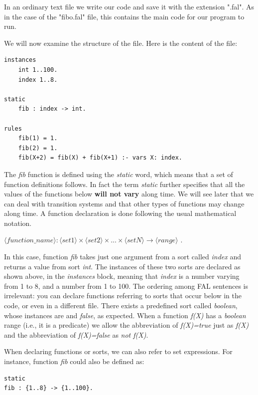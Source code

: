 \documentclass[a4paper,12pt]{report}
\begin{document}
	In an ordinary text file we write our code and save it with the extension ".fal". As in the case of the "fibo.fal" file, this contains the main code for our program to run. 

	We will now examine the structure of the file. Here is the content of the file:
\begin{verbatim}  
instances
	int 1..100.
	index 1..8.

static
	fib : index -> int.

rules
	fib(1) = 1.
	fib(2) = 1.
	fib(X+2) = fib(X) + fib(X+1) :- vars X: index.

\end{verbatim}

	The \textit{fib} function is defined using the \textit{static} word, which means that a set of function definitions follows. In fact the term \textit{static} further specifies that all the values of the functions below \textbf{will not vary} along time. We will see later that we can deal with transition systems and that other types of functions may change along time. A function declaration is done following the usual mathematical notation.


\begin{addmargin}
$\langle function\_name\rangle : \langle set1\rangle \times \langle set2\rangle \times ... \times \langle setN\rangle   \rightarrow   \langle range\rangle$ .
\end{addmargin}


	In this case, function \textit{fib} takes just one argument from a sort called \textit{index} and returns a value from sort \textit{int}. The instances of these two sorts are declared as shown above, in the \textit{instances} block, meaning that \textit{index} is a number varying from 1 to 8, and  a number from 1 to 100.
The ordering among FAL sentences is irrelevant: you can declare functions referring to sorts that occur below in the code, or even in a different file. There exists a predefined sort called \textit{boolean}, whose instances are  and \textit{false}, as expected. When a function  \textit{f(X)} has a \textit{boolean} range (i.e., it is a predicate) we allow the abbreviation of \textit{f(X)=true} just as \textit{f(X)} and the abbreviation of \textit{f(X)=false} as \textit{not f(X)}.

	When declaring functions or sorts, we can also refer to set expressions. For instance, function \textit{fib} could also be defined as:

\begin{verbatim}
static 
fib : {1..8} -> {1..100}.
\end{verbatim}
	
\end{document}
